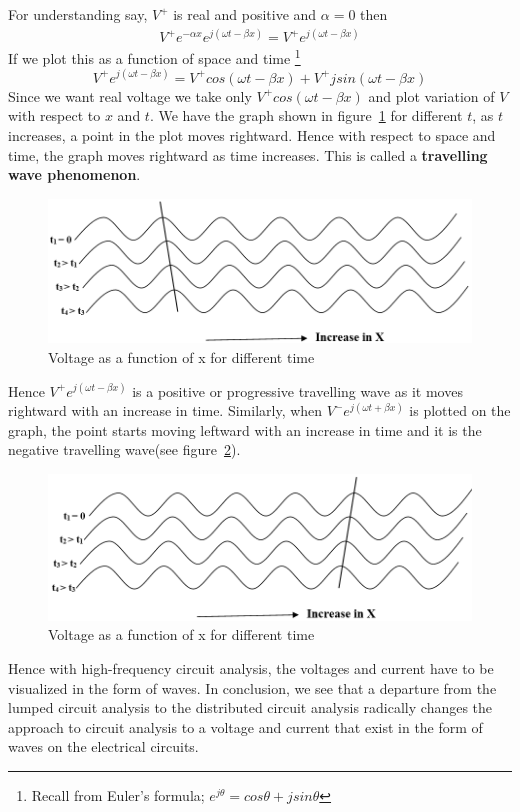 For understanding say, $  V^{+} $ is real and positive and $ \alpha= 0 $ then
\begin{align*}
V^{+}e^{-\alpha x}e^{j( \omega t-\beta x)} = V^{+} e^{j( \omega t-\beta x)}
\end{align*}
If we plot this as a function of space and time
\footnote{Recall from Euler's formula; $ e^{j\theta} = cos\theta + jsin\theta $}
\begin{equation*}
V^{+}e^{j( \omega t-\beta x)} = V^{+}cos(\omega t- \beta x) +  V^{+}jsin(\omega t- \beta x)
\end{equation*}
Since we want real voltage we take only $ V^{+}cos(\omega t- \beta x) $ and plot variation of $ V $ with respect to $ x $ and $ t $. We have the graph shown in figure~\ref{fig:abc} for different $ t $, as $ t $ increases, a point in the plot moves rightward. Hence with respect to space and time, the graph moves rightward as time increases. This is called a \textbf{travelling wave phenomenon}.
\begin{figure}[h]
\centering
\includegraphics[width=1\linewidth]{./graphics/ABC}
\caption{Voltage as a function of x for different time}
\label{fig:abc}
\end{figure}

Hence  $ V^{+}e^{j(\omega t- \beta x )} $ is a positive or progressive travelling wave as it moves rightward with an increase in time. Similarly, when $ V^{-}e^{j( \omega t+ \beta x )} $ is plotted on the graph, the point starts moving leftward with an increase in time and it is the negative travelling wave(see figure~\ref{fig:abcd}).
\begin{figure}[h]
\centering
\includegraphics[width=1\linewidth]{./graphics/ABCD}
\caption{Voltage as a function of x for different time}
\label{fig:abcd}
\end{figure}

Hence with high-frequency circuit analysis, the voltages and current have to be visualized in the form of waves. In conclusion, we see that a departure from the lumped circuit analysis to the distributed circuit analysis radically changes the approach to circuit analysis to a voltage and current that exist in the form of waves on the electrical circuits. 